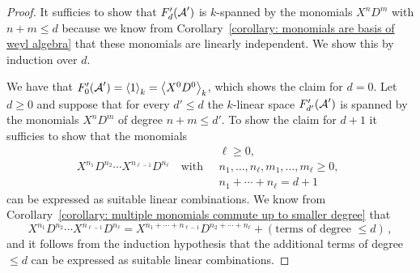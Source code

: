 \begin{proof}
  It sufficies to show that $F'_d(\operatorname{\mathcal{A}}')$ is $k$-spanned by the monomials $X^n D^m$ with $n+m \leq d$ because we know from Corollary~\ref{corollary: monomials are basis of weyl algebra} that these monomials are linearly independent.
  We show this by induction over $d$.
  
  We have that $F'_0(\operatorname{\mathcal{A}}') = \left\langle 1 \right\rangle_k = \left\langle X^0 D^0 \right\rangle_k$, which shows the claim for $d = 0$.
  Let $d \geq 0$ and suppose that for every $d' \leq d$ the $k$-linear space $F'_{d'}(\operatorname{\mathcal{A}}')$ is spanned by the monomials $X^n D^m$ of degree $n + m \leq d'$.
  To show the claim for $d + 1$ it sufficies to show that the monomials
  \[
    X^{n_1} D^{n_2} \dotsm X^{n_{\ell-1}} D^{n_\ell}
    \quad\text{with}\quad
    \begin{array}{c}
      \ell \geq 0,  \\
      n_1, \dotsc, n_\ell, m_1, \dotsc, m_\ell \geq 0,  \\
      n_1 + \dotsb + n_\ell = d + 1
    \end{array}
  \]
  can be expressed as suitable linear combinations.
  We know from Corollary~\ref{corollary: multiple monomials commute up to smaller degree} that
  \[
      X^{n_1} D^{n_2} \dotsm X^{n_{\ell-1}} D^{n_\ell}
    =   X^{n_1 + \dotsb + n_{\ell-1}} D^{n_2 + \dotsb + n_\ell}
      + (\text{terms of degree $\leq d$}) \,,
  \]
  and it follows from the induction hypothesis that the additional terms of degree $\leq d$ can be expressed as suitable linear combinations.
\end{proof}


